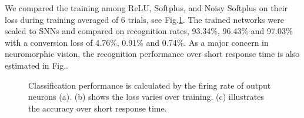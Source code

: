 \documentclass[runningheads,a4paper]{llncs}
\begin{document}
We compared the training among ReLU, Softplus, and Noisy Softplus on their loss during training averaged of 6 trials, see Fig.\ref{fig:training}.
The trained networks were scaled to SNNs and compared on recognition rates, 93.34\%, 96.43\% and 97.03\% with a conversion loss of 4.76\%, 0.91\% and 0.74\%.
As a major concern in neuromorphic vision, the recognition performance over short response time is also estimated in Fig..
\begin{figure}[bt!]
	\centering
	\caption{
	Classification performance is calculated by the firing rate of output neurons (a).
	(b) shows the loss varies over training.
	(c) illustrates the accuracy over short response time.}
	\label{fig:training}	
\end{figure}

\end{document}
